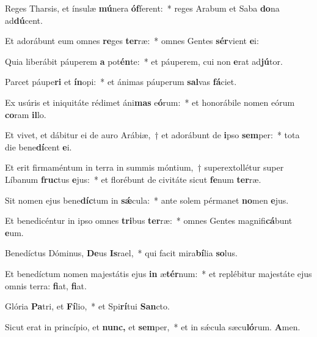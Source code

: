 \item Reges Tharsis, et ínsulæ \textbf{mú}nera \textbf{óf}ferent:~* reges Arabum et Saba \textbf{do}na ad\textbf{dú}cent.
\item Et adorábunt eum omnes \textbf{re}ges \textbf{ter}ræ:~* omnes Gentes \textbf{sér}vient \textbf{e}i:
\item Quia liberábit páuperem \textbf{a} pot\textbf{én}te:~* et páuperem, cui non \textbf{e}rat ad\textbf{jú}tor.
\item Parcet páupe\textbf{ri} et \textbf{ín}opi:~* et ánimas páuperum \textbf{sal}vas \textbf{fá}ciet.
\item Ex usúris et iniquitáte rédimet áni\textbf{mas} e\textbf{ó}rum:~* et honorábile nomen eórum \textbf{co}ram \textbf{il}lo.
\item Et vivet, et dábitur ei de auro Arábiæ,~† et adorábunt de \textbf{i}pso \textbf{sem}per:~* tota die bene\textbf{dí}cent \textbf{e}i.
\item Et erit firmaméntum in terra in summis móntium,~† superextollétur super Líbanum \textbf{fruc}tus \textbf{e}jus:~* et florébunt de civitáte sicut \textbf{fe}num \textbf{ter}ræ.
\item Sit nomen ejus bene\textbf{díc}tum in \textbf{sǽ}cula:~* ante solem pérmanet \textbf{no}men \textbf{e}jus.
\item Et benedicéntur in ipso omnes \textbf{tri}bus \textbf{ter}ræ:~* omnes Gentes magnifi\textbf{cá}bunt \textbf{e}um.
\item Benedíctus Dóminus, \textbf{De}us \textbf{Is}rael,~* qui facit mira\textbf{bí}lia \textbf{so}lus.
\item Et benedíctum nomen majestátis ejus \textbf{in} æ\textbf{tér}num:~* et replébitur majestáte ejus omnis terra: \textbf{fi}at, \textbf{fi}at.
\item Glória \textbf{Pa}tri, et \textbf{Fí}lio,~* et Spi\textbf{rí}tui \textbf{San}cto.
\item Sicut erat in princípio, et \textbf{nunc,} et \textbf{sem}per,~* et in sǽcula sæcu\textbf{ló}rum. \textbf{A}men.

